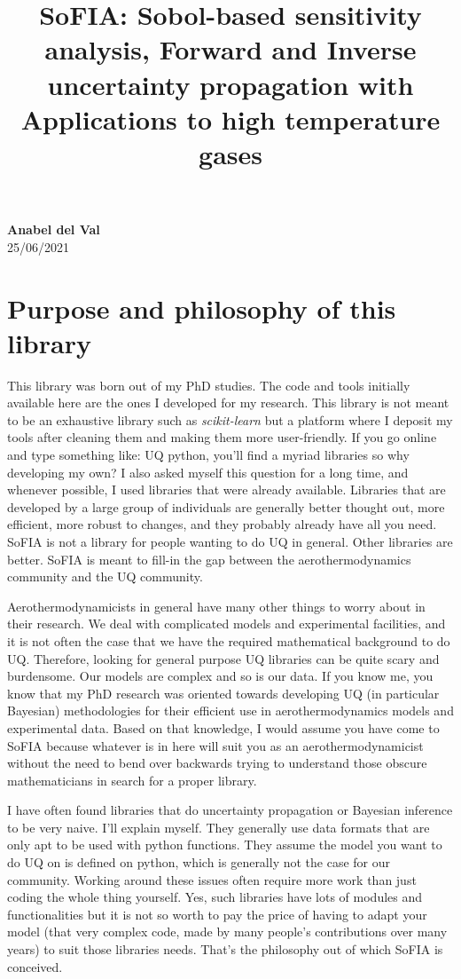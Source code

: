 \documentclass[12pt]{article}
\title{\large \textbf{SoFIA: So}bol-based sensitivity analysis, \textbf{F}orward and \textbf{I}nverse uncertainty propagation with \textbf{A}pplications to high temperature gases}
\date{}
\begin{document}
\maketitle
\vspace{-1.8cm}
\begin{center}
\textbf{Anabel del Val}\\
\vspace{0.5cm}
25/06/2021
\end{center}

\section{Purpose and philosophy of this library}

This library was born out of my PhD studies. The code and tools initially available here are the ones I developed for my research. This library is not meant to be an exhaustive library such as \textit{scikit-learn} but a platform where I deposit my tools after cleaning them and making them more user-friendly. If you go online and type something like: UQ python, you'll find a myriad libraries so why developing my own? I also asked myself this question for a long time, and whenever possible, I used libraries that were already available. Libraries that are developed by a large group of individuals are generally better thought out, more efficient, more robust to changes, and they probably already have all you need. SoFIA is not a library for people wanting to do UQ in general. Other libraries are better. SoFIA is meant to fill-in the gap between the aerothermodynamics community and the UQ community.

Aerothermodynamicists in general have many other things to worry about in their research. We deal with complicated models and experimental facilities, and it is not often the case that we have the required mathematical background to do UQ. Therefore, looking for general purpose UQ libraries can be quite scary and burdensome. Our models are complex and so is our data. If you know me, you know that my PhD research was oriented towards developing UQ (in particular Bayesian) methodologies for their efficient use in aerothermodynamics models and experimental data. Based on that knowledge, I would assume you have come to SoFIA because whatever is in here will suit you as an aerothermodynamicist without the need to bend over backwards trying to understand those obscure mathematicians in search for a proper library.

I have often found libraries that do uncertainty propagation or Bayesian inference to be very naive. I'll explain myself. They generally use data formats that are only apt to be used with python functions. They assume the model you want to do UQ on is defined on python, which is generally not the case for our community. Working around these issues often require more work than just coding the whole thing yourself. Yes, such libraries have lots of modules and functionalities but it is not so worth to pay the price of having to adapt your model (that very complex code, made by many people's contributions over many years) to suit those libraries needs. That's the philosophy out of which SoFIA is conceived.
\end{document}
